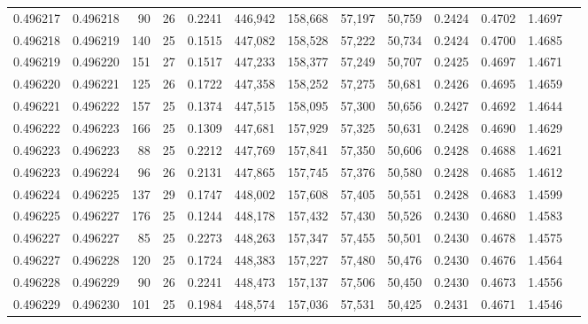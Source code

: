 \begin{tabular}{rrrrrrrrrrrrr}
0.496217 & 0.496218 &  90 &  26 &                                     0.2241 & 446,942 & 158,668 &  57,197 &  50,759 & 0.2424 & 0.4702 & 1.4697 \\
0.496218 & 0.496219 & 140 &  25 &                                     0.1515 & 447,082 & 158,528 &  57,222 &  50,734 & 0.2424 & 0.4700 & 1.4685 \\
0.496219 & 0.496220 & 151 &  27 &                                     0.1517 & 447,233 & 158,377 &  57,249 &  50,707 & 0.2425 & 0.4697 & 1.4671 \\
0.496220 & 0.496221 & 125 &  26 &                                     0.1722 & 447,358 & 158,252 &  57,275 &  50,681 & 0.2426 & 0.4695 & 1.4659 \\
0.496221 & 0.496222 & 157 &  25 &                                     0.1374 & 447,515 & 158,095 &  57,300 &  50,656 & 0.2427 & 0.4692 & 1.4644 \\
0.496222 & 0.496223 & 166 &  25 &                                     0.1309 & 447,681 & 157,929 &  57,325 &  50,631 & 0.2428 & 0.4690 & 1.4629 \\
0.496223 & 0.496223 &  88 &  25 &                                     0.2212 & 447,769 & 157,841 &  57,350 &  50,606 & 0.2428 & 0.4688 & 1.4621 \\
0.496223 & 0.496224 &  96 &  26 &                                     0.2131 & 447,865 & 157,745 &  57,376 &  50,580 & 0.2428 & 0.4685 & 1.4612 \\
0.496224 & 0.496225 & 137 &  29 &                                     0.1747 & 448,002 & 157,608 &  57,405 &  50,551 & 0.2428 & 0.4683 & 1.4599 \\
0.496225 & 0.496227 & 176 &  25 &                                     0.1244 & 448,178 & 157,432 &  57,430 &  50,526 & 0.2430 & 0.4680 & 1.4583 \\
0.496227 & 0.496227 &  85 &  25 &                                     0.2273 & 448,263 & 157,347 &  57,455 &  50,501 & 0.2430 & 0.4678 & 1.4575 \\
0.496227 & 0.496228 & 120 &  25 &                                     0.1724 & 448,383 & 157,227 &  57,480 &  50,476 & 0.2430 & 0.4676 & 1.4564 \\
0.496228 & 0.496229 &  90 &  26 &                                     0.2241 & 448,473 & 157,137 &  57,506 &  50,450 & 0.2430 & 0.4673 & 1.4556 \\
0.496229 & 0.496230 & 101 &  25 &                                     0.1984 & 448,574 & 157,036 &  57,531 &  50,425 & 0.2431 & 0.4671 & 1.4546 \\

\end{tabular}
